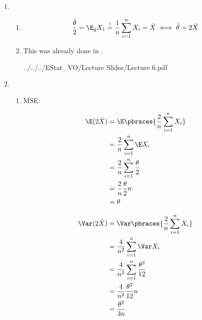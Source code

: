\begin{solution}

\phantom{}

\begin{enumerate}[label = (\alph*)]

    \item

    \begin{enumerate}[label = (\roman*)]

        \item 

        \begin{align*}
            \frac{\hat \theta}{2} = \E_{\hat \theta} X_1 \stackrel{!}{=} \frac{1}{n} \sum_{i=1}^n X_i = \bar X
            \iff
            \hat \theta = 2 \bar X
        \end{align*}

        \item This was already done in \cite[lecture 6, slides 68-69]{EStat}.

        
        {../../../EStat_VO/Lecture Slides/Lecture 6.pdf}

    \end{enumerate}

    \item

    \begin{enumerate}[label = \arabic*.]

        \item MSE:
        
        \begin{align*}
            \E(2 \bar X)
            & =
            \E \pbraces{\frac{2}{n} \sum_{i=1}^n X_i} \\
            & =
            \frac{2}{n}
            \sum_{i=1}^n \E X_i \\
            & =
            \frac{2}{n}
            \sum_{i=1}^n
                \frac{\theta}{2} \\
            & =
            \frac{2}{n}
            \frac{\theta}{2}
            n \\
            & =
            \theta
        \end{align*}
        
        \begin{align*}
            \Var(2 \hat X)
            & =
            \Var \pbraces{\frac{2}{n} \sum_{i=1}^n X_i} \\
            & =
            \frac{4}{n^2}
            \sum_{i=1}^n
                \Var X_i \\
            & =
            \frac{4}{n^2}
            \sum_{i=1}^n
                \frac{\theta^2}{12} \\
            & =
            \frac{4}{n^2}
            \frac{\theta^2}{12}
            n \\
            & =
            \frac{\theta^2}{3 n}
        \end{align*}


\end{enumerate}
\end{enumerate}
\end{solution}
